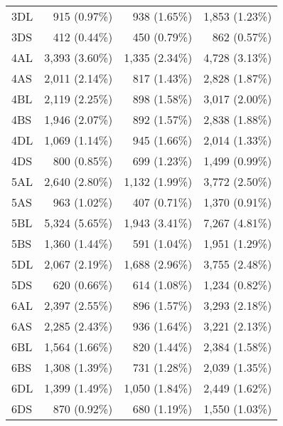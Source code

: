 \begin{table}
\begin{localsize}{10}{12}
\begin{tabular}{lrrr}
 3DL                     & 915 (0.97\%)     & 938 (1.65\%)            & 1,853 (1.23\%)     \\
 3DS                     & 412 (0.44\%)     & 450 (0.79\%)            & 862 (0.57\%)       \\
 \midrule
 4AL                     & 3,393 (3.60\%)   & 1,335 (2.34\%)          & 4,728 (3.13\%)     \\
 4AS                     & 2,011 (2.14\%)   & 817 (1.43\%)            & 2,828 (1.87\%)     \\
 4BL                     & 2,119 (2.25\%)   & 898 (1.58\%)            & 3,017 (2.00\%)     \\
 4BS                     & 1,946 (2.07\%)   & 892 (1.57\%)            & 2,838 (1.88\%)     \\
 4DL                     & 1,069 (1.14\%)   & 945 (1.66\%)            & 2,014 (1.33\%)     \\
 4DS                     & 800 (0.85\%)     & 699 (1.23\%)            & 1,499 (0.99\%)     \\
 \midrule
 5AL                     & 2,640 (2.80\%)   & 1,132 (1.99\%)          & 3,772 (2.50\%)     \\
 5AS                     & 963 (1.02\%)     & 407 (0.71\%)            & 1,370 (0.91\%)     \\
 5BL                     & 5,324 (5.65\%)   & 1,943 (3.41\%)          & 7,267 (4.81\%)     \\
 5BS                     & 1,360 (1.44\%)   & 591 (1.04\%)            & 1,951 (1.29\%)     \\
 5DL                     & 2,067 (2.19\%)   & 1,688 (2.96\%)          & 3,755 (2.48\%)     \\
 5DS                     & 620 (0.66\%)     & 614 (1.08\%)            & 1,234 (0.82\%)     \\
 \midrule
 6AL                     & 2,397 (2.55\%)   & 896 (1.57\%)            & 3,293 (2.18\%)     \\
 6AS                     & 2,285 (2.43\%)   & 936 (1.64\%)            & 3,221 (2.13\%)     \\
 6BL                     & 1,564 (1.66\%)   & 820 (1.44\%)            & 2,384 (1.58\%)     \\
 6BS                     & 1,308 (1.39\%)   & 731 (1.28\%)            & 2,039 (1.35\%)     \\
 6DL                     & 1,399 (1.49\%)   & 1,050 (1.84\%)          & 2,449 (1.62\%)     \\
 6DS                     & 870 (0.92\%)     & 680 (1.19\%)            & 1,550 (1.03\%)     \\

\end{tabular}
\end{localsize}
\end{table}
